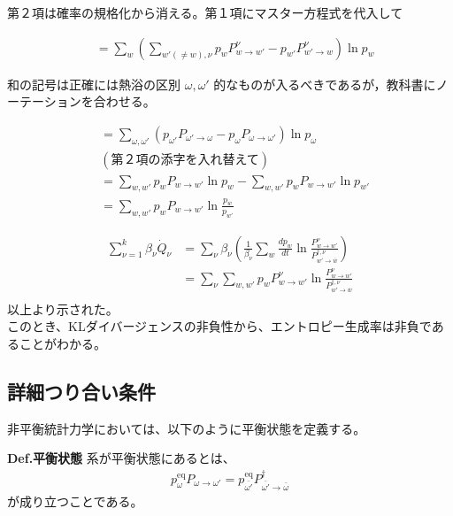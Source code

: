 \documentclass[a4paper,11pt]{jsarticle}
\numberwithin{equation}{section}
\begin{document}
第２項は確率の規格化から消える。第１項にマスター方程式を代入して

\begin{align}
&= \sum_w \left( \sum_{w'(\neq w), \nu} p_w P_{w \to w'}^\nu - p_{w'} P_{w' \to w}^\nu \right) \ln p_w
\end{align}

和の記号は正確には熱浴の区別 $\omega, \omega'$ 的なものが入るべきであるが，教科書にノーテーションを合わせる。

\begin{align}
&= \sum_{\omega, \omega'} \left( p_{\omega'} P_{\omega' \rightarrow \omega} - p_\omega P_{\omega \rightarrow \omega'} \right) \ln p_\omega \\
&(\text{第２項の添字を入れ替えて})\\
&= \sum_{w, w'} p_w P_{w \to w'} \ln p_w - \sum_{w, w'} p_w P_{w \to w'} \ln p_{w'} \\
&= \sum_{w, w'} p_w P_{w \to w'} \ln \frac{p_w}{p_{w'}}
\end{align}

\begin{align}
\sum_{\nu=1}^{k} \beta_\nu \dot{Q}_\nu &= \sum_{\nu} \beta_\nu \left( \frac{1}{\beta_\nu} \sum_w \frac{dp_w}{dt} \ln \frac{P_{w \to w'}^\nu}{P_{w' \to \overline{w}}^{\dagger, \nu}} \right)\\
&= \sum_{\nu} \sum_{w, w'} p_w P_{w \to w'}^\nu \ln \frac{P_{w \to w'}^\nu}{P_{w' \to \overline{w}}^{\dagger, \nu}}\\
\end{align}
以上より示された。\\
このとき、KLダイバージェンスの非負性から、エントロピー生成率は非負であることがわかる。\\

\subsection{詳細つり合い条件}
非平衡統計力学においては、以下のように平衡状態を定義する。
\begin{itembox}[l]{\textbf{Def.平衡状態}}
  系が平衡状態にあるとは、
  \begin{align}
    p_{\omega}^{\text{eq}}P_{\omega \to \omega'} = p_{\bar{\omega'}}^{\text{eq}}P_{\bar{\omega'} \to \bar{\omega}}^{\dagger}
  \end{align}
  が成り立つことである。

\end{itembox}
\end{document}
